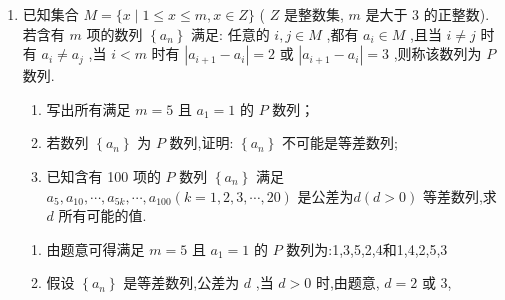 \begin{enumerate}
\begin{jieda}
\begin{enumerate}
            $n = 1$ 时也成立.
            
            $\smallsetminus  {a}_{n} = {2}^{n - 1},$
            
            $\because \dfrac{{a}_{n}}{{a}_{n - 1}} = \dfrac{{2}^{n - 1}}{{2}^{n - 2}} = 2$ ,
            
            $\therefore$ 数列 $\left\{  {a}_{n}\right\}$ 是等比数列,首项为 1,公比为 2 .
            
            $\therefore$ 数列 $\left\{  {a}_{n}\right\}$ 的前 $n$ 项的和为 ${S}_{n} = \dfrac{{2}^{n} - 1}{2 - 1} = {2}^{n} - 1$ .
            \item $\because {c}_{n} = \dfrac{{a}_{n + 1}}{\left( {1 + {b}_{n}}\right)  \cdot  \left( {2 + {S}_{n}}\right) } = \dfrac{{2}^{n}}{\left( {1 + {2}^{n - 1}}\right) \left( {2 + {2}^{n} - 1}\right) } = 2\left( {\dfrac{1}{{2}^{n - 1} + 1} - \dfrac{1}{{2}^{n} + 1}}\right)$ ,
            
            $\therefore$ 数列 $\left\{  {c}_{n}\right\}$ 的前 $n$ 项和 ${T}_{n} = 2\left( {\dfrac{1}{2} - \dfrac{1}{3} + \dfrac{1}{3} - \dfrac{1}{5} + \cdots  + \dfrac{1}{{2}^{n - 1} + 1}\dfrac{1}{{2}^{n} + 1}}\right)  = 2\left( {\dfrac{1}{2} - \dfrac{1}{{2}^{n} + 1}}\right)  < 2 \times  \dfrac{1}{2} = 1$ ,
            
            $\therefore {T}_{n} < 1$ .
        \end{enumerate}
    \end{jieda}
    \item 已知集合 $M = \{ x \mid  1 \leq  x \leq  m,x \in  Z\}$ ( $Z$ 是整数集, $m$ 是大于 3 的正整数). 若含有 $m$ 项的数列 $\left\{  {a}_{n}\right\}$ 满足: 任意的 $i,j \in  M$ ,都有 ${a}_{i} \in  M$ ,且当 $i \neq  j$ 时有 ${a}_{i} \neq  {a}_{j}$ ,当 $i < m$ 时有 $\left| {{a}_{i + 1} - {a}_{i}}\right|  = 2$ 或 $\left| {{a}_{i + 1} - {a}_{i}}\right|  = 3$ ,则称该数列为 $P$ 数列.
    \begin{enumerate}
        \item 写出所有满足 $m = 5$ 且 ${a}_{1} = 1$ 的 $P$ 数列；
        \item 若数列 $\left\{  {a}_{n}\right\}$ 为 $P$ 数列,证明: $\left\{  {a}_{n}\right\}$ 不可能是等差数列;
        \item 已知含有 100 项的 $P$ 数列 $\left\{  {a}_{n}\right\}$ 满足 ${a}_{5},{a}_{10},\cdots ,{a}_{5k},\cdots ,{a}_{100}\left( {k = 1,2,3,\cdots ,{20}}\right)$ 是公差为$d\left( {d > 0}\right)$ 等差数列,求 $d$ 所有可能的值.
    \end{enumerate}
    \begin{jieda}
        \begin{enumerate}
            \item 由题意可得满足 $m = 5$ 且 ${a}_{1} = 1$ 的 $P$ 数列为:1,3,5,2,4和1,4,2,5,3
            \item 假设 $\left\{  {a}_{n}\right\}$ 是等差数列,公差为 $d$ ,当 $d > 0$ 时,由题意, $d = 2$ 或 3,
            

\end{enumerate}
\end{jieda}
\end{enumerate}
